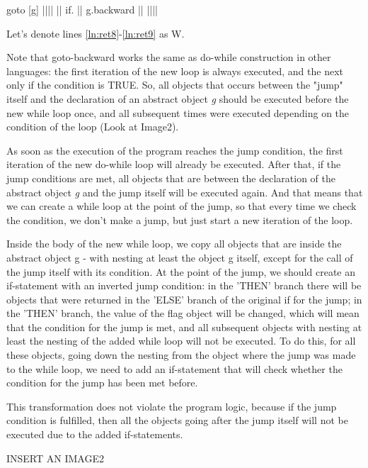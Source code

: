 \documentclass[sigplan,review,11pt,nonacm,natbib=false]{acmart}
\begin{document}
\begin{ffcode}
goto
  [g]
    |||$\label{ln:ret8}$|
      ||
      if.
        ||
        g.backward
        ||
      |||$\label{ln:ret9}$|
\end{ffcode}

Let's denote lines \ref{ln:ret8}-\ref{ln:ret9} as W.

Note that goto-backward works the same as do-while construction in other languages: the first iteration of the new loop is always executed, and the next only if the condition is TRUE.
So, all objects that occurs between the "jump" itself and the declaration of an abstract object \emph{g} should be executed before the new while loop once, and all subsequent times were executed depending on the condition of the loop (Look at Image2).

As soon as the execution of the program reaches the jump condition, the first iteration of the new do-while loop will already be executed.
After that, if the jump conditions are met, all objects that are between the declaration of the abstract object \emph{g} and the jump itself will be executed again. And that means that we can create a while loop at the point of the jump, so that every time we check the condition, we don't make a jump, but just start a new iteration of the loop.

Inside the body of the new while loop, we copy all objects that are inside the abstract object g - with nesting at least the object g itself, except for the call of the jump itself with its condition.
At the point of the jump, we should create an if-statement with an inverted jump condition: in the 'THEN' branch there will be objects that were returned in the 'ELSE' branch of the original if for the jump; in the 'THEN' branch, the value of the flag object will be changed, which will mean that the condition for the jump is met, and all subsequent objects with nesting at least the nesting of the added while loop will not be executed.
To do this, for all these objects, going down the nesting from the object where the jump was made to the while loop, we need to add an if-statement that will check whether the condition for the jump has been met before.

This transformation does not violate the program logic, because if the jump condition is fulfilled, then all the objects going after the jump itself will not be executed due to the added if-statements.

{INSERT AN IMAGE2}
\end{document}
